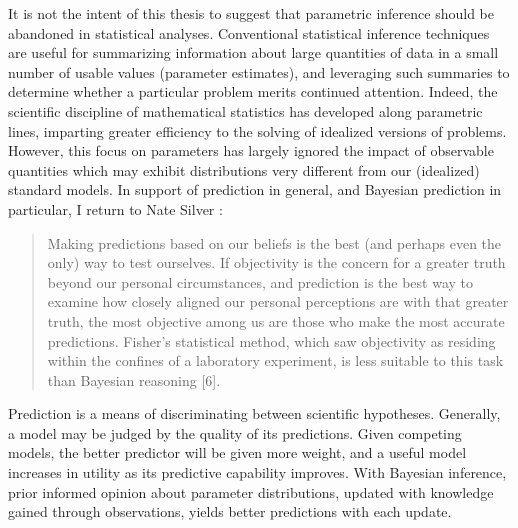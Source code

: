 \documentclass[12pt, a4paper]{article}
\begin{document}
\noindent It is not the intent of this thesis to suggest that parametric inference should be abandoned in statistical analyses.  Conventional statistical inference techniques are useful for summarizing information about large quantities of data in a small number of usable values (parameter estimates), and leveraging such summaries to determine whether a particular problem merits continued attention. Indeed, the scientific discipline of mathematical statistics has developed along parametric lines, imparting greater efficiency to the solving of idealized versions of problems. However, this focus on parameters has largely ignored the impact of observable quantities which may exhibit distributions very different from our (idealized) standard models. In support of prediction in general, and Bayesian prediction in particular, I return to Nate Silver :\\

\begin{quote}
Making predictions based on our beliefs is the best (and perhaps even the only) way to test ourselves. If objectivity is the concern for a greater truth beyond our personal circumstances, and prediction is the best way to examine how closely aligned our personal perceptions are with that greater truth, the most objective among us are those who make the most accurate predictions. Fisher’s statistical method, which saw objectivity as residing within the confines of a laboratory experiment, is less suitable to this task than Bayesian reasoning [6].
\end{quote}



\noindent Prediction is a means of discriminating between scientific hypotheses. Generally, a model may be judged by the quality of its predictions.  Given competing models, the better predictor will be given more weight, and a useful model increases in utility as its predictive capability improves.  With Bayesian inference, prior informed opinion about parameter distributions, updated with knowledge gained through observations, yields better predictions with each update.\\

\end{document}
